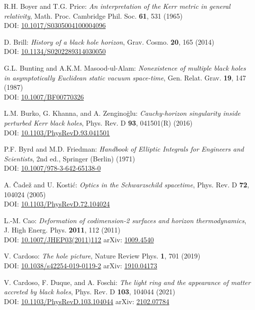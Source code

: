 \begin{thebibliography}{123}
R.H. Boyer and T.G. Price: {\em An interpretation of the Kerr metric in general relativity},
Math. Proc. Cambridge Phil. Soc. {\bf 61}, 531 (1965)\\
DOI: \href{https://doi.org/10.1017/S0305004100004096}{10.1017/S0305004100004096}

D. Brill: {\em History of a black hole horizon},
Grav. Cosmo. {\bf 20}, 165 (2014) \\
DOI: \href{https://doi.org/10.1134/S0202289314030050}{10.1134/S0202289314030050}

G.L. Bunting and A.K.M. Masood-ul-Alam:
{\em Nonexistence of multiple black holes in asymptotically Euclidean static vacuum space-time},
Gen. Relat. Grav. {\bf 19}, 147 (1987)\\
DOI: \href{https://doi.org/10.1007/BF00770326}{10.1007/BF00770326}

L.M. Burko, G. Khanna, and A. Zenginoğlu: {\em
Cauchy-horizon singularity inside perturbed Kerr black holes},
Phys. Rev. D {\bf 93}, 041501(R) (2016) \\
DOI: \href{https://doi.org/10.1103/PhysRevD.93.041501}{10.1103/PhysRevD.93.041501}

P.F. Byrd and M.D. Friedman:
{\em Handbook of Elliptic Integrals for Engineers and Scientists},
2nd ed., Springer (Berlin) (1971)\\
DOI: \href{https://doi.org/10.1007/978-3-642-65138-0}{10.1007/978-3-642-65138-0}

A. \v{C}ade\v{z} and U. Kosti\'c:
{\em Optics in the Schwarzschild spacetime},
Phys. Rev. D {\bf 72}, 104024 (2005)\\
DOI: \href{https://doi.org/10.1103/PhysRevD.72.104024}{10.1103/PhysRevD.72.104024}

L.-M. Cao:
{\em Deformation of codimension-2 surfaces and horizon thermodynamics},
J. High Energ. Phys. {\bf 2011}, 112 (2011)\\
DOI: \href{https://doi.org/10.1007/JHEP03(2011)112}{10.1007/JHEP03(2011)112}\hfill
arXiv: \href{https://arxiv.org/abs/1009.4540}{1009.4540}

V. Cardoso:
{\em The hole picture},
Nature Review Phys. {\bf 1}, 701 (2019)\\
DOI: \href{https://doi.org/10.1038/s42254-019-0119-2}{10.1038/s42254-019-0119-2}\hfill
arXiv: \href{https://arxiv.org/abs/1910.04173}{1910.04173}

V. Cardoso, F. Duque, and A. Foschi:
{\em The light ring and the appearance of matter accreted by black holes},
Phys. Rev. D {\bf 103}, 104044 (2021)\\
DOI: \href{https://doi.org/10.1103/PhysRevD.103.104044}{10.1103/PhysRevD.103.104044}\hfill
arXiv: \href{https://arxiv.org/abs/2102.07784}{2102.07784}


\end{thebibliography}

